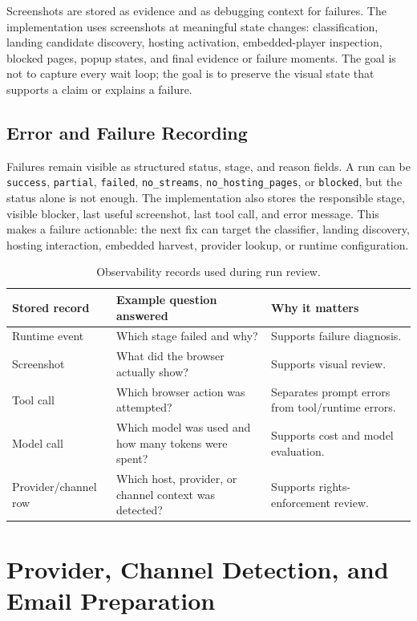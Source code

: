 Screenshots are stored as evidence and as debugging context for failures. The
implementation uses screenshots at meaningful state changes: classification,
landing candidate discovery, hosting activation, embedded-player inspection,
blocked pages, popup states, and final evidence or failure moments. The goal is
not to capture every wait loop; the goal is to preserve the visual state that
supports a claim or explains a failure.

\subsection{Error and Failure Recording}

Failures remain visible as structured status, stage, and reason fields. A run
can be \texttt{success}, \texttt{partial}, \texttt{failed},
\texttt{no\_streams}, \texttt{no\_hosting\_pages}, or \texttt{blocked}, but
the status alone is not enough. The implementation also stores the responsible
stage, visible blocker, last useful screenshot, last tool call, and error
message. This makes a failure actionable: the next fix can target the
classifier, landing discovery, hosting interaction, embedded harvest,
provider lookup, or runtime configuration.

\begin{table}[!htbp]
\centering
\begin{tabularx}{\textwidth}{Q{3.2cm} Y Y}
\toprule
{}
Stored record & Example question answered & Why it matters \\
\midrule
Runtime event & Which stage failed and why? & Supports failure diagnosis. \\
Screenshot & What did the browser actually show? & Supports visual review. \\
Tool call & Which browser action was attempted? & Separates prompt errors from
tool/runtime errors. \\
Model call & Which model was used and how many tokens were spent? & Supports
cost and model evaluation. \\
Provider/channel row & Which host, provider, or channel context was detected? &
Supports rights-enforcement review. \\
\bottomrule
\end{tabularx}
\caption{Observability records used during run review.}
\label{tab:persistence-observability}
\end{table}

\section{Provider, Channel Detection, and Email Preparation}

